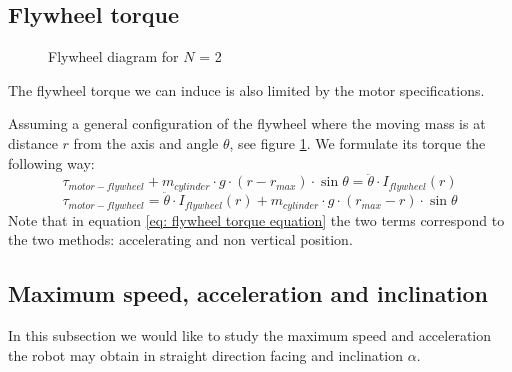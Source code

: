 \subsection{Flywheel torque}
\begin{figure}
	\centering
            \caption{Flywheel diagram for $N$ = 2}
	\label{fig:Flywheel force diagram}
\end{figure}

The flywheel torque we can induce is also limited by the motor specifications. 

Assuming a general configuration of the flywheel where the moving mass is at distance $r$ from the axis and angle $\theta$, see figure \ref{fig:Flywheel force diagram}. We formulate its torque the following way:
\[
    \tau_{motor-flywheel} + m_{cylinder} \cdot g \cdot (r - r_{max}) \cdot \sin{\theta} = \ddot{\theta}\cdot I_{flywheel}(r)  
\]
\begin{equation}\label{eq: flywheel torque equation}    
    \tau_{motor-flywheel} = \ddot{\theta}\cdot I_{flywheel}(r) + m_{cylinder} \cdot g \cdot (r_{max} - r) \cdot \sin{\theta}  
\end{equation}
Note that in equation \ref{eq: flywheel torque equation} the two terms correspond to the two methods: accelerating and non vertical position.

\subsection{Maximum speed, acceleration and inclination}
In this subsection we would like to study the maximum speed and acceleration the robot may obtain in straight direction facing and inclination $\alpha$.

